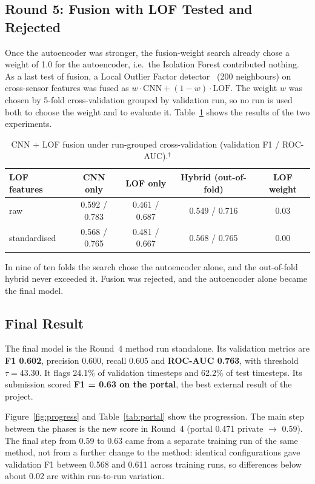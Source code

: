 \documentclass[runningheads]{llncs}
\newcommand{\doc}{$^\dagger$}
\begin{document}
\subsection{Round 5: Fusion with LOF Tested and Rejected}

Once the autoencoder was stronger, the fusion-weight search already chose a weight of 1.0 for the autoencoder, i.e.\ the Isolation Forest contributed nothing. As a last test of fusion, a Local Outlier Factor detector~\cite{breunig2000lof} (200 neighbours) on cross-sensor features was fused as $w \cdot \text{CNN} + (1-w) \cdot \text{LOF}$. The weight $w$ was chosen by 5-fold cross-validation grouped by validation run, so no run is used both to choose the weight and to evaluate it. Table~\ref{tab:lof} shows the results of the two experiments.

\begin{table}[ht]
\centering
\caption{CNN + LOF fusion under run-grouped cross-validation (validation F1 / ROC-AUC).\doc}\label{tab:lof}
\begin{tabular}{|l|c|c|c|c|}
\hline
LOF features & CNN only & LOF only & Hybrid (out-of-fold) & LOF weight \\
\hline
raw & 0.592 / 0.783 & 0.461 / 0.687 & 0.549 / 0.716 & 0.03 \\
standardised & 0.568 / 0.765 & 0.481 / 0.667 & 0.568 / 0.765 & 0.00 \\
\hline
\end{tabular}
\end{table}

In nine of ten folds the search chose the autoencoder alone, and the out-of-fold hybrid never exceeded it. Fusion was rejected, and the autoencoder alone became the final model.

\subsection{Final Result}

The final model is the Round~4 method run standalone. Its validation metrics are \textbf{F1 0.602}, precision 0.600, recall 0.605 and \textbf{ROC-AUC 0.763}, with threshold $\tau = 43.30$. It flags 24.1\% of validation timesteps and 62.2\% of test timesteps. Its submission scored \textbf{F1 = 0.63 on the portal}, the best external result of the project.

Figure~\ref{fig:progress} and Table~\ref{tab:portal} show the progression. The main step between the phases is the new score in Round~4 (portal 0.471 private $\rightarrow$ 0.59). The final step from 0.59 to 0.63 came from a separate training run of the same method, not from a further change to the method: identical configurations gave validation F1 between 0.568 and 0.611 across training runs, so differences below about 0.02 are within run-to-run variation.
\end{document}
